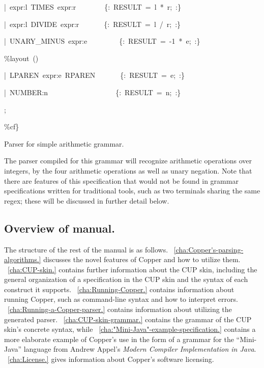 \documentclass[12pt,english,twoside]{report}
\newenvironment{codeblock}
{\begin{list}{}{
\setlength{\rightmargin}{\leftmargin}
\setlength{\listparindent}{0pt}%
\raggedright
\setlength{\itemsep}{0pt}
\setlength{\parsep}{0pt}
\normalfont\ttfamily}%
 \item[]}
{\end{list}}
\begin{document}
\begin{algorithm}
\begin{codeblock}
\begin{codeblock}
\begin{codeblock}
{\small |~expr:l~TIMES~expr:r~~~~~~~~\{:~RESULT~=~l~{*}~r;~:\}}{\small \par}

{\small |~expr:l~DIVIDE~expr:r~~~~~~~\{:~RESULT~=~l~/~r;~:\}}{\small \par}

{\small |~UNARY\_MINUS~expr:e~~~~~~~~~\{:~RESULT~=~-1~{*}~e;~:\}}{\small \par}
\begin{codeblock}
{\small \%layout~()}{\small \par}
\end{codeblock}
{\small |~LPAREN~expr:e~RPAREN~~~~~~~\{:~RESULT~=~e;~:\}}{\small \par}

{\small |~NUMBER:n~~~~~~~~~~~~~~~~~~~\{:~RESULT~=~n;~:\}}{\small \par}

{\small ;}{\small \par}
\end{codeblock}
\end{codeblock}
{\small \%cf\}}{\small \par}
\end{codeblock}

\caption{\label{alg:Arithmetic-parser}Parser for simple arithmetic grammar.}
\end{algorithm}
 The parser compiled for this grammar will recognize arithmetic operations
over integers, by the four arithmetic operations as well as unary
negation. Note that there are features of this specification that
would not be found in grammar specifications written for traditional
tools, such as two terminals sharing the same regex; these will be
discussed in further detail below.

\subsection{Overview of manual.}

The structure of the rest of the manual is as follows.
%
\chaptername~\ref{cha:Copper's-parsing-algorithms.} discusses the
novel features of Copper and how to utilize them.
%
\chaptername~\ref{cha:CUP-skin.} contains further information about
the CUP skin, including the general organization of a specification
in the CUP skin and the syntax of each construct it supports.
%
\chaptername~\ref{cha:Running-Copper.} contains information about
running Copper, such as command-line syntax and how to interpret
errors.
%
\chaptername~\ref{cha:Running-a-Copper-parser.} contains
information about utilizing the generated parser.
%
\appendixname~\ref{cha:CUP-skin-grammar.} contains the grammar of the
CUP skin's concrete syntax,
%
while \appendixname ~\ref{cha:"Mini-Java"-example-specification.}
contains a more elaborate example of Copper's use in the form of a
grammar for the {}``Mini-Java'' language from Andrew Appel's
\emph{Modern Compiler Implementation in Java}.
%
\appendixname~\ref{cha:License.} gives information about Copper's
software licensing.
\end{document}
